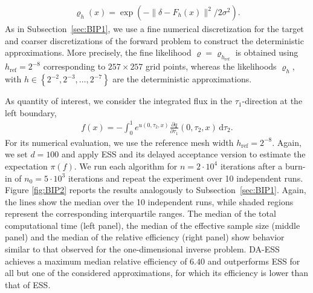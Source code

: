 \documentclass[sn-mathphys-num]{sn-jnl}%
\theoremstyle{thmstyleone}%
\theoremstyle{thmstyletwo}%
\theoremstyle{thmstylethree}%
\begin{document}
{\begin{align*}
   \varrho_h(x) = \exp\left(- \lVert \delta - F_h(x) \rVert^2 /2\sigma^2\right).
\end{align*}
As in Subsection~\ref{sec:BIP1}, we use a fine numerical discretization for the target and coarser discretizations of the forward problem to construct the deterministic approximations. More precisely, the fine likelihood $\varrho=\varrho_{h_{\mathrm{ref}}}$ is obtained using $h_{\mathrm{ref}}=2^{-8}$ corresponding to $257\times257$ grid points, whereas the likelihoods
$\varrho_h$, with $h\in \left\{2^{-2},2^{-3},\dots,2^{-7}\right\}$ are the deterministic approximations. 

As quantity of interest, we consider the integrated flux in the
$\tau_1$-direction at the left boundary,
\begin{align*}
    f(x)=-\int_0^1 e^{u(0,\tau_2,x)} \frac{\partial q}{\partial\tau_1}(0,\tau_2,x) \,\mathrm d\tau_2.
\end{align*}
For its numerical evaluation, we use the reference mesh width $h_{\mathrm{ref}}=2^{-8}$. Again, we set $d=100$ and apply ESS and its delayed acceptance version to estimate the expectation $\pi(f)$. We run each algorithm for $n=2\cdot 10^4$ iterations after a burn-in of $n_0=5\cdot 10^3$ iterations and repeat the experiment over 10 independent runs. Figure \ref{fig:BIP2} reports the results analogously to Subsection~\ref{sec:BIP1}. Again, the lines show the median over the 10 independent runs, while shaded regions represent the corresponding interquartile ranges. The median of the total computational time (left panel), the median of the effective sample size (middle panel) and the median of the relative efficiency (right panel) show behavior similar to that observed for the one-dimensional inverse problem. DA-ESS achieves a maximum median relative efficiency of $6.40$ and outperforms ESS for all but one of the considered approximations, for which its efficiency is lower than that of ESS.   

}
\end{document}
